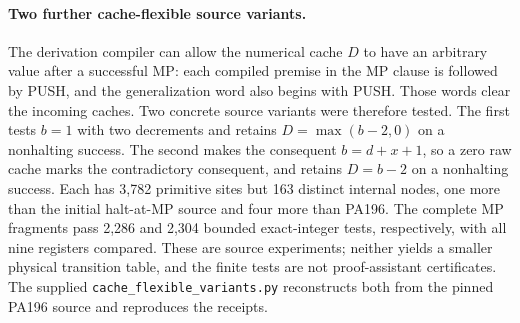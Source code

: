 \paragraph{Two further cache-flexible source variants.}
The derivation compiler can allow the numerical cache $D$ to have an
arbitrary value after a successful MP: each compiled premise in the
MP clause is followed by PUSH, and the generalization word also begins with PUSH.
Those words clear the incoming caches.  Two concrete source variants
were therefore tested.  The first tests $b=1$ with two decrements and
retains $D=\max(b-2,0)$ on a nonhalting success.  The second makes the
consequent $b=d+x+1$, so a zero raw cache marks the contradictory
consequent, and retains $D=b-2$ on a nonhalting success.  Each has
3,782 primitive sites but 163 distinct internal nodes, one more than
the initial halt-at-MP source and four more than PA196.  The complete
MP fragments pass 2,286 and 2,304 bounded exact-integer tests,
respectively, with all nine registers compared.  These are source
experiments; neither yields a smaller physical transition table, and
the finite tests are not proof-assistant certificates.  The supplied
\texttt{cache\_flexible\_variants.py} reconstructs both from the pinned
PA196 source and reproduces the receipts.

